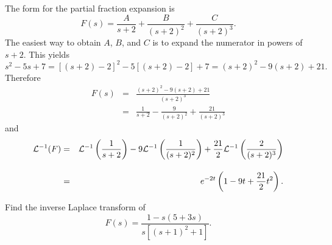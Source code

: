 \begin{examplesolution}
\solution The form for the partial fraction expansion is
\[
  F(s)=\frac{A}{s+2}+\frac{B}{(s+2)^{2}}+\frac{C}{(s+2)^{3}}.
\]
The easiest way to obtain $A$, $B$, and $C$ is to expand the numerator in powers of $s+2$. This
yields
\[
  s^{2}-5s+7=[(s+2)-2]^{2}-5[(s+2)-2]+7=(s+2)^{2}-9(s+2)+21.
\]
Therefore
\begin{eqnarray*}
  F(s) & = & \frac{(s+2)^{2}-9(s+2)+21}{(s+2)^{3}} \\[10pt]
       & = & \frac{1}{s+2}-\frac{9}{(s+2)^{2}}+\frac{21}{(s+2)^{3}}
\end{eqnarray*}
and
\begin{eqnarray*}
  {\cal L}^{-1}(F) & = & {\cal L}^{-1}\left(\frac{1}{s+2}\right)-9{\cal L}^{-1}\left(\frac{1}{(s+2)^{2}}\right)+\frac{21}{2}{\cal L}^{-1}\left(\frac{2}{(s+2)^{3}}\right) \\[10pt]
                   & = & e^{-2t}\left(1-9t+\frac{21}{2}t^{2}\right).
\end{eqnarray*}
\end{examplesolution}

\begin{example}
  \label{example:8.2.8}\rm %
  Find the inverse Laplace transform of
  \begin{equation}
    \label{eq:8.2.13}F(s)=\frac{1-s(5+3s)}{s\left[(s+1)^{2}+1\right]}.
  \end{equation}
\end{example}

